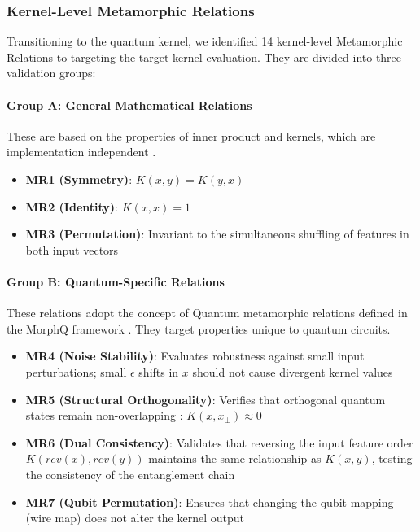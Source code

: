 \documentclass[12pt,a4paper]{article}
\begin{document}
	\subsubsection{Kernel-Level Metamorphic Relations}
	\label{sec:kernel_mrs}
	
	Transitioning to the quantum kernel, we identified 14 kernel-level Metamorphic Relations to targeting the target kernel evaluation. They are divided into three validation groups:
	
	\paragraph{Group A: General Mathematical Relations}
	These are based on the properties of inner product and kernels, which are implementation independent \cite{schuld2019}.
	\begin{itemize}
		\item \textbf{MR1 (Symmetry)}: $K(x,y) = K(y,x)$ 
		\item \textbf{MR2 (Identity)}: $K(x,x) = 1$
		\item \textbf{MR3 (Permutation)}: Invariant to the simultaneous shuffling of features in both input vectors \cite{xie2011}
	\end{itemize}
	
	\paragraph{Group B: Quantum-Specific Relations}
	These relations adopt the concept of Quantum metamorphic relations defined in the MorphQ framework \cite{Paltenghi2023}. They target properties unique to quantum circuits.
	
	\begin{itemize}
		\item \textbf{MR4 (Noise Stability)}: Evaluates robustness against small input perturbations; small $\epsilon$ shifts in $x$ should not cause divergent kernel values
		\item \textbf{MR5 (Structural Orthogonality)}: Verifies that orthogonal quantum states remain non-overlapping \cite{schuld2019}: $K(x, x_{\perp}) \approx 0$
		\item \textbf{MR6 (Dual Consistency)}: Validates that reversing the input feature order $K(rev(x), rev(y))$ maintains the same relationship as $K(x, y)$, testing the consistency of the entanglement chain \cite{Paltenghi2023}
		\item \textbf{MR7 (Qubit Permutation)}: Ensures that changing the qubit mapping (wire map) does not alter the kernel output \cite{Paltenghi2023}
	\end{itemize}
	
\end{document}
